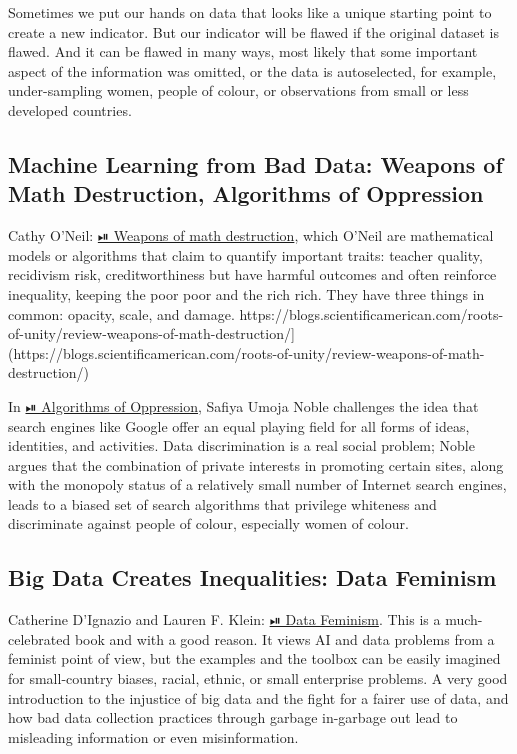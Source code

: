 \documentclass[
  letterpaper,
  DIV=11,
  numbers=noendperiod]{scrreprt}
\begin{document}
Sometimes we put our hands on data that looks like a unique starting
point to create a new indicator. But our indicator will be flawed if the
original dataset is flawed. And it can be flawed in many ways, most
likely that some important aspect of the information was omitted, or the
data is autoselected, for example, under-sampling women, people of
colour, or observations from small or less developed countries.

\subsection{Machine Learning from Bad Data: Weapons of Math Destruction,
Algorithms of
Oppression}\label{machine-learning-from-bad-data-weapons-of-math-destruction-algorithms-of-oppression}

Cathy O'Neil:
\href{https://en.wikipedia.org/wiki/Weapons_of_Math_Destruction}{⏯
Weapons of math destruction}, which O'Neil are mathematical models or
algorithms that claim to quantify important traits: teacher quality,
recidivism risk, creditworthiness but have harmful outcomes and often
reinforce inequality, keeping the poor poor and the rich rich. They have
three things in common: opacity, scale, and damage.
https://blogs.scientificamerican.com/roots-of-unity/review-weapons-of-math-destruction/{]}(https://blogs.scientificamerican.com/roots-of-unity/review-weapons-of-math-destruction/)

In \href{https://nyupress.org/9781479837243/algorithms-of-oppression/}{⏯
Algorithms of Oppression}, Safiya Umoja Noble challenges the idea that
search engines like Google offer an equal playing field for all forms of
ideas, identities, and activities. Data discrimination is a real social
problem; Noble argues that the combination of private interests in
promoting certain sites, along with the monopoly status of a relatively
small number of Internet search engines, leads to a biased set of search
algorithms that privilege whiteness and discriminate against people of
colour, especially women of colour.

\subsection{Big Data Creates Inequalities: Data
Feminism}\label{big-data-creates-inequalities-data-feminism}

Catherine D'Ignazio and Lauren F. Klein:
\href{https://mitpress.mit.edu/books/data-feminism}{⏯ Data Feminism}.
This is a much-celebrated book and with a good reason. It views AI and
data problems from a feminist point of view, but the examples and the
toolbox can be easily imagined for small-country biases, racial, ethnic,
or small enterprise problems. A very good introduction to the injustice
of big data and the fight for a fairer use of data, and how bad data
collection practices through garbage in-garbage out lead to misleading
information or even misinformation.
\end{document}

